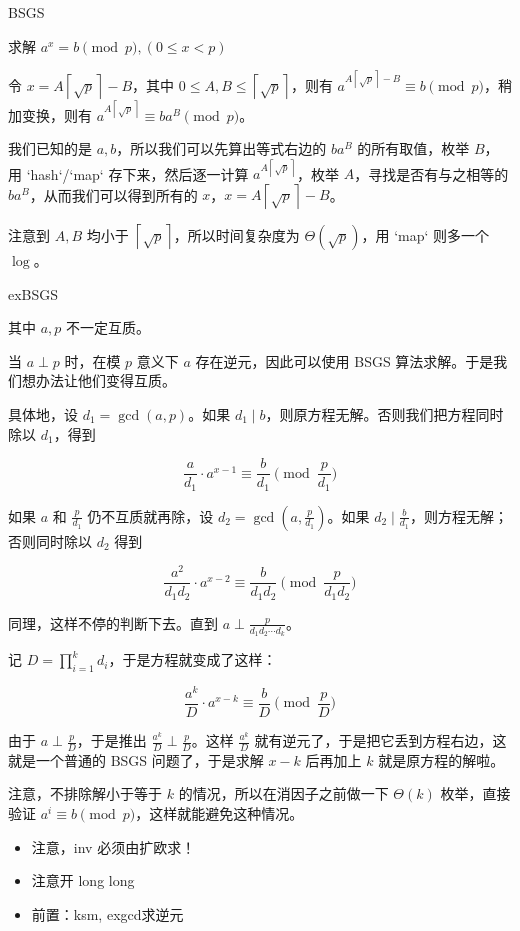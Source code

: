 BSGS

求解 $a^x=b\pmod{p}, (0\le x< p)$

令 $x = A \left \lceil \sqrt p \right \rceil - B$，其中 $0\le A,B \le \left \lceil \sqrt p \right \rceil$，则有 $a^{A\left \lceil \sqrt p \right \rceil -B} \equiv b \pmod p$，稍加变换，则有 $a^{A\left \lceil \sqrt p \right \rceil} \equiv ba^B \pmod p$。

我们已知的是 $a,b$，所以我们可以先算出等式右边的 $ba^B$ 的所有取值，枚举 $B$，用 `hash`/`map` 存下来，然后逐一计算 $a^{A\left \lceil \sqrt p \right \rceil}$，枚举 $A$，寻找是否有与之相等的 $ba^B$，从而我们可以得到所有的 $x$，$x=A \left \lceil \sqrt p \right \rceil - B$。

注意到 $A,B$ 均小于 $\left \lceil \sqrt p \right \rceil$，所以时间复杂度为 $\Theta\left (\sqrt p\right )$，用 `map` 则多一个 $\log$。

\noindent exBSGS

其中 $a,p$ 不一定互质。

当 $a\perp p$ 时，在模 $p$ 意义下 $a$ 存在逆元，因此可以使用 BSGS 算法求解。于是我们想办法让他们变得互质。

具体地，设 $d_1=\gcd(a,p)$。如果 $d_1\mid b$，则原方程无解。否则我们把方程同时除以 $d_1$，得到

$$ \frac{a}{d_1}\cdot a^{x-1}\equiv \frac{b}{d_1}\pmod{\frac{p}{d_1}} $$

如果 $a$ 和 $\frac{p}{d_1}$ 仍不互质就再除，设 $d_2=\gcd\left(a,\frac{p}{d_1}\right)$。如果 $d_2\mid \frac{b}{d_1}$，则方程无解；否则同时除以 $d_2$ 得到

$$ \frac{a^2}{d_1d_2}\cdot a^{x-2}≡\frac{b}{d_1d_2} \pmod{\frac{p}{d_1d_2}} $$

同理，这样不停的判断下去。直到 $a\perp \frac{p}{d_1d_2\cdots d_k}$。

记 $D=\prod_{i=1}^kd_i$，于是方程就变成了这样：

$$ \frac{a^k}{D}\cdot a^{x-k}\equiv\frac{b}{D} \pmod{\frac{p}{D}} $$

由于 $a\perp\frac{p}{D}$，于是推出 $\frac{a^k}{D}\perp \frac{p}{D}$。这样 $\frac{a^k}{D}$ 就有逆元了，于是把它丢到方程右边，这就是一个普通的 BSGS 问题了，于是求解 $x-k$ 后再加上 $k$ 就是原方程的解啦。

注意，不排除解小于等于 $k$ 的情况，所以在消因子之前做一下 $\Theta(k)$ 枚举，直接验证 $a^i\equiv b \pmod p$，这样就能避免这种情况。

\begin{itemize}
    \item 注意，inv 必须由扩欧求！
    \item 注意开 long long
    \item 前置：ksm, exgcd求逆元
\end{itemize}


